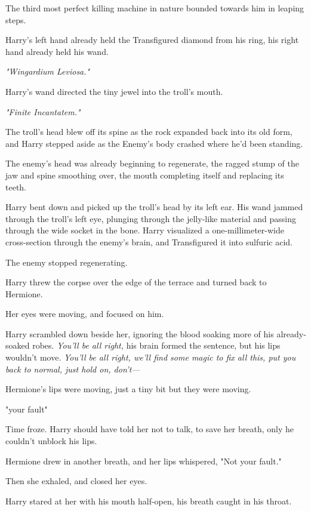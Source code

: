 The third most perfect killing machine in nature bounded towards him in leaping
steps.

\emph{}

Harry's left hand already held the Transfigured diamond from his ring, his
right hand already held his wand.

\emph{"Wingardium Leviosa."}

Harry's wand directed the tiny jewel into the troll's mouth.

\emph{"Finite Incantatem."}

The troll's head blew off its spine as the rock expanded back into its old
form, and Harry stepped aside as the Enemy's body crashed where he'd been
standing.

The enemy's head was already beginning to regenerate, the ragged stump of the
jaw and spine smoothing over, the mouth completing itself and replacing its
teeth.

Harry bent down and picked up the troll's head by its left ear. His wand jammed
through the troll's left eye, plunging through the jelly-like material and
passing through the wide socket in the bone. Harry visualized a
one-millimeter-wide cross-section through the enemy's brain, and Transfigured
it into sulfuric acid.

The enemy stopped regenerating.

Harry threw the corpse over the edge of the terrace and turned back to Hermione.

Her eyes were moving, and focused on him.

Harry scrambled down beside her, ignoring the blood soaking more of his
already-soaked robes. \emph{You'll be all right,} his brain formed the
sentence, but his lips wouldn't move. \emph{You'll be all right, we'll find
some magic to fix all this, put you back to normal, just hold on, don't---}

Hermione's lips were moving, just a tiny bit but they were moving.

"your{\el} fault{\el}"

Time froze. Harry should have told her not to talk, to save her breath, only he
couldn't unblock his lips.

Hermione drew in another breath, and her lips whispered, "Not your fault."

Then she exhaled, and closed her eyes.

Harry stared at her with his mouth half-open, his breath caught in his throat.


